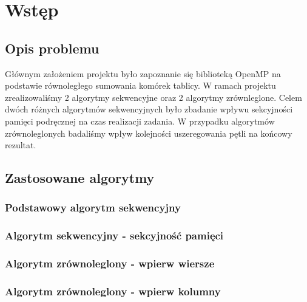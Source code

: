 \section{Wstęp}

\subsection{Opis problemu}

Głównym założeniem projektu było zapoznanie się biblioteką OpenMP na podstawie równoległego sumowania komórek tablicy. W ramach projektu zrealizowaliśmy 2 algorytmy sekwencyjne oraz 2 algorytmy zrównleglone. Celem dwóch różnych algorytmów sekwencyjnych było zbadanie wpływu sekcyjności pamięci podręcznej na czas realizacji zadania. W przypadku algorytmów zrównoleglonych badaliśmy wpływ kolejności uszeregowania pętli na końcowy rezultat.

\subsection{Zastosowane algorytmy}

\subsubsection{Podstawowy algorytm sekwencyjny}



\subsubsection{Algorytm sekwencyjny - sekcyjność pamięci}



\subsubsection{Algorytm zrównoleglony - wpierw wiersze}



\subsubsection{Algorytm zrównoleglony - wpierw kolumny}

